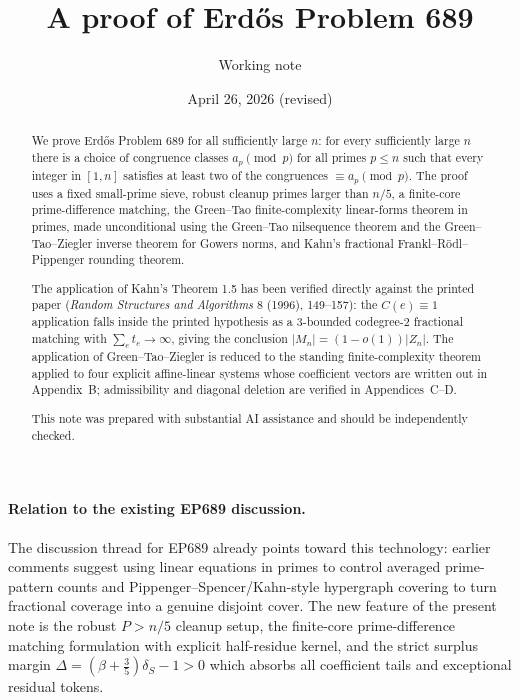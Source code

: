 \documentclass[11pt]{article}
\title{A proof of Erd\H{o}s Problem 689}
\author{Working note}
\date{April 26, 2026 (revised)}
\begin{document}
\maketitle

\begin{abstract}
We prove Erd\H{o}s Problem 689 for all sufficiently large \(n\): for every
sufficiently large \(n\) there is a choice of congruence classes
\(a_p\pmod p\) for all primes \(p\le n\) such that every integer in \([1,n]\)
satisfies at least two of the congruences \(\equiv a_p\pmod p\).  The proof
uses a fixed small-prime sieve, robust cleanup primes larger than \(n/5\), a
finite-core prime-difference matching, the Green--Tao finite-complexity
linear-forms theorem in primes, made unconditional using the Green--Tao
nilsequence theorem and the Green--Tao--Ziegler inverse theorem for Gowers
norms, and Kahn's fractional Frankl--R\"odl--Pippenger rounding theorem.

The application of Kahn's Theorem 1.5 has been verified directly against the
printed paper (\emph{Random Structures and Algorithms} 8 (1996), 149--157):
the $C(e)\equiv 1$ application falls inside the printed hypothesis as a
3-bounded codegree-2 fractional matching with $\sum_e t_e\to\infty$, giving
the conclusion $|M_n|=(1-o(1))|Z_n|$.  The application of Green--Tao--Ziegler
is reduced to the standing finite-complexity theorem applied to four explicit
affine-linear systems whose coefficient vectors are written out in
Appendix~B; admissibility and diagonal deletion are verified in
Appendices~C--D.

This note was prepared with substantial AI assistance and should be
independently checked.
\end{abstract}

\paragraph{Relation to the existing EP689 discussion.}
The discussion thread for EP689 already points toward this technology: earlier
comments suggest using linear equations in primes to control averaged
prime-pattern counts and Pippenger--Spencer/Kahn-style hypergraph covering to
turn fractional coverage into a genuine disjoint cover.  The new feature of
the present note is the robust \(P>n/5\) cleanup setup, the finite-core
prime-difference matching formulation with explicit half-residue kernel, and
the strict surplus margin
\(\Delta=(\beta+\tfrac35)\delta_S-1>0\) which absorbs all coefficient tails
and exceptional residual tokens.
\end{document}
